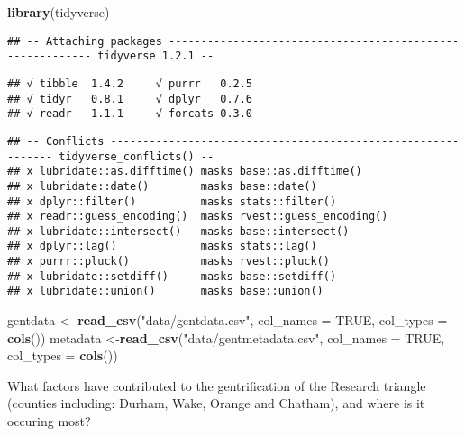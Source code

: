 \documentclass[]{article}
\title{}
\subtitle{Project Proposal}
\author{Apache Junction Armchairs: Ellie, Ryan, Sude, Darren}
\date{2/27/2020}
\newenvironment{Shaded}{\begin{snugshade}}{\end{snugshade}}
\newcommand{\DataTypeTok}[1]{\textcolor[rgb]{0.13,0.29,0.53}{#1}}
\newcommand{\KeywordTok}[1]{\textcolor[rgb]{0.13,0.29,0.53}{\textbf{#1}}}
\newcommand{\NormalTok}[1]{#1}
\newcommand{\OtherTok}[1]{\textcolor[rgb]{0.56,0.35,0.01}{#1}}
\newcommand{\StringTok}[1]{\textcolor[rgb]{0.31,0.60,0.02}{#1}}
\begin{document}
\begin{Shaded}
\begin{Highlighting}[]
\KeywordTok{library}\NormalTok{(tidyverse)}
\end{Highlighting}
\end{Shaded}

\begin{verbatim}
## -- Attaching packages ---------------------------------------------------------- tidyverse 1.2.1 --
\end{verbatim}

\begin{verbatim}
## √ tibble  1.4.2     √ purrr   0.2.5
## √ tidyr   0.8.1     √ dplyr   0.7.6
## √ readr   1.1.1     √ forcats 0.3.0
\end{verbatim}

\begin{verbatim}
## -- Conflicts ------------------------------------------------------------- tidyverse_conflicts() --
## x lubridate::as.difftime() masks base::as.difftime()
## x lubridate::date()        masks base::date()
## x dplyr::filter()          masks stats::filter()
## x readr::guess_encoding()  masks rvest::guess_encoding()
## x lubridate::intersect()   masks base::intersect()
## x dplyr::lag()             masks stats::lag()
## x purrr::pluck()           masks rvest::pluck()
## x lubridate::setdiff()     masks base::setdiff()
## x lubridate::union()       masks base::union()
\end{verbatim}

\begin{Shaded}
\begin{Highlighting}[]
\NormalTok{gentdata <-}\StringTok{ }\KeywordTok{read_csv}\NormalTok{(}\StringTok{"data/gentdata.csv"}\NormalTok{, }\DataTypeTok{col_names =} \OtherTok{TRUE}\NormalTok{, }\DataTypeTok{col_types =} \KeywordTok{cols}\NormalTok{())}
\NormalTok{metadata <-}\KeywordTok{read_csv}\NormalTok{(}\StringTok{"data/gentmetadata.csv"}\NormalTok{, }\DataTypeTok{col_names =} \OtherTok{TRUE}\NormalTok{, }\DataTypeTok{col_types =} \KeywordTok{cols}\NormalTok{())}
\end{Highlighting}
\end{Shaded}

What factors have contributed to the gentrification of the Research
triangle (counties including: Durham, Wake, Orange and Chatham), and
where is it occuring most?
\end{document}
